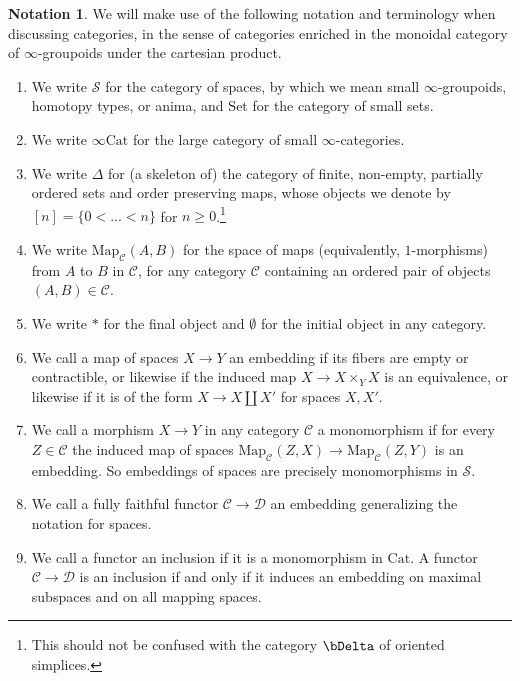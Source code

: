 \documentclass[10pt,oneside]{article}
\numberwithin{equation}{section} %
\numberwithin{figure}{section} %
\theoremstyle{plain}
\theoremstyle{definition}
\newtheorem{notation}[thm]{Notation}
\newcommand{\mC}{{\mathcal C}}
\newcommand{\mD}{{\mathcal D}}
\newcommand{\mS}{{\mathcal S}}
\newcommand{\n}{{n}}
\newcommand{\Cat}{\mathrm{Cat}}
\newcommand{\Set}{\mathrm{Set}}
\newcommand{\Map}{{\mathrm{Map}}}
\begin{document}
\begin{notation}
We will make use of the following notation and terminology when discussing categories, in the sense of categories enriched in the monoidal category of $\infty$-groupoids under the cartesian product.
\begin{enumerate}[\normalfont(1)]\setlength{\itemsep}{-2pt}
\item We write $\mS$ for the category of spaces, by which we mean small $\infty$-groupoids, homotopy types, or anima, and $\Set$ for the category of small sets.
\item We write $\infty\Cat$ for the large category of small $\infty$-categories.

\item We write $\Delta$ for (a skeleton of) the category of finite, non-empty, partially ordered sets and order preserving maps, whose objects we denote by $[\n] = \{0 < ... < \n\}$ for $\n \geq 0$.\footnote{This should not be confused with the category $\bDelta$ of oriented simplices.}
\item We write $\Map_{\mC}(A,B)$ for the space of maps (equivalently, $1$-morphisms) from $A$ to $B$ in $\mC$, for any category $\mC$ containing an ordered pair of objects $(A,B)\in\mC$.

\item We write $\ast$ for the final object and
$\emptyset$ for the initial object in any category.

\item We call a map of spaces $X \to Y$ an embedding if its fibers are empty or contractible, or likewise if the induced map $X \to X \times_Y X$ is an equivalence, or likewise if it is of the form $X \to X \coprod X'$ for spaces $X,X'.$ 

\item We call a morphism $X \to Y$ in any category $\mC$ a monomorphism if for every $Z \in \mC$ the induced map of spaces $\Map_\mC(Z,X) \to \Map_\mC(Z,Y) $ is an embedding. So embeddings of spaces are precisely monomorphisms in $\mS.$ 

\item We call a fully faithful functor $\mC \to \mD$ an embedding generalizing the notation for spaces.

\item We call a functor an inclusion if it is a monomorphism in $\Cat$. A functor $\mC \to \mD$ is an inclusion if and only if it induces an embedding on maximal subspaces and on all mapping spaces. 


\end{enumerate}
\end{notation}
\end{document}
